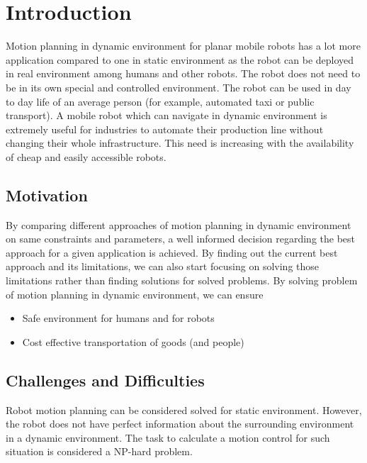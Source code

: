 
\chapter{Introduction}

Motion planning in dynamic environment for planar mobile robots has a lot more application compared to one in static 
environment as the robot can be deployed in real environment among humans and other robots. 
The robot does not need to be in its own special and controlled environment. The robot can be 
used in day to day life of an average person (for example, automated taxi or public transport).
A mobile robot which can navigate in dynamic environment is extremely useful for industries to 
automate their production line without changing their whole infrastructure.
This need is increasing with the availability of cheap and easily accessible robots. 

\section{Motivation}
\label{sec:motivation}
By comparing different approaches of motion planning in dynamic environment on same constraints and parameters, 
a well informed decision regarding the best approach for a given application is achieved. By finding out the 
current best approach and its limitations, we can also start focusing on solving those limitations
rather than finding solutions for solved problems. 
By solving problem of motion planning in dynamic environment, we can ensure 
\begin{itemize}
    \item Safe environment for humans and for robots
    \item Cost effective transportation of goods (and people\cite{prassler2001robotics})
\end{itemize}


\section{Challenges and Difficulties}
\label{sec:challenges_and_difficulties}
Robot motion planning can be considered solved for static environment\cite{large2005navigation}.  
However, the robot does not have perfect information about the surrounding environment in a
dynamic environment. The task to calculate a motion control for such situation is considered
a NP-hard problem\cite{keshmiri2009overview}. 

